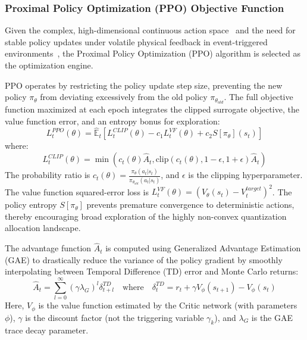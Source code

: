 \subsubsection{Proximal Policy Optimization (PPO) Objective Function}
Given the complex, high-dimensional continuous action space~\cite{CCDRL} and the need for stable policy updates under volatile physical feedback in event-triggered environments~\cite{ETDRL}, the Proximal Policy Optimization (PPO) algorithm is selected as the optimization engine. 

PPO operates by restricting the policy update step size, preventing the new policy $\pi_\theta$ from deviating excessively from the old policy $\pi_{\theta_{old}}$. The full objective function maximized at each epoch integrates the clipped surrogate objective, the value function error, and an entropy bonus for exploration:
\begin{equation}
    L_t^{PPO}(\theta) = \hat{\mathbb{E}}_t \left[ L_t^{CLIP}(\theta) - c_1 L_t^{VF}(\theta) + c_2 S[\pi_\theta](s_t) \right]
\end{equation}
where:
\begin{equation}
    L_t^{CLIP}(\theta) = \min\left( c_t(\theta)\hat{A}_t, \text{clip}(c_t(\theta), 1-\epsilon, 1+\epsilon)\hat{A}_t \right)
\end{equation}
The probability ratio is $c_t(\theta) = \frac{\pi_\theta(a_t|s_t)}{\pi_{\theta_{old}}(a_t|s_t)}$, and $\epsilon$ is the clipping hyperparameter. The value function squared-error loss is $L_t^{VF}(\theta) = (V_\theta(s_t) - V_t^{target})^2$. The policy entropy $S[\pi_\theta]$ prevents premature convergence to deterministic actions, thereby encouraging broad exploration of the highly non-convex quantization allocation landscape.

The advantage function $\hat{A}_t$ is computed using Generalized Advantage Estimation (GAE) to drastically reduce the variance of the policy gradient by smoothly interpolating between Temporal Difference (TD) error and Monte Carlo returns:
\begin{equation}
    \hat{A}_t = \sum_{l=0}^{\infty} (\gamma \lambda_G)^l \delta_{t+l}^{TD} \quad \text{where} \quad \delta_t^{TD} = r_t + \gamma V_\phi(s_{t+1}) - V_\phi(s_t)
\end{equation}
Here, $V_\phi$ is the value function estimated by the Critic network (with parameters $\phi$), $\gamma$ is the discount factor (not the triggering variable $\gamma_k$), and $\lambda_G$ is the GAE trace decay parameter. 

